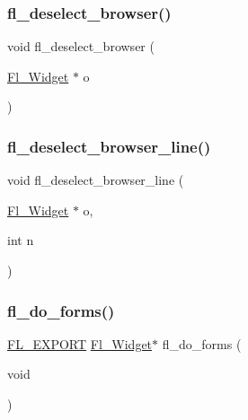 \mbox{\label{forms_8_h_a120b109edd8338165d1f036e545621f6}} 
\subsubsection{\texorpdfstring{fl\+\_\+deselect\+\_\+browser()}{fl\_deselect\_browser()}}
{\footnotesize\ttfamily void fl\+\_\+deselect\+\_\+browser (\begin{DoxyParamCaption}\item[{\hyperlink{class_fl___widget}{Fl\+\_\+\+Widget} $\ast$}]{o }\end{DoxyParamCaption})\hspace{0.3cm}{\ttfamily [inline]}}

\mbox{\label{forms_8_h_aa0e93f9fd96e44dd783f75eebfdd3c59}} 
\subsubsection{\texorpdfstring{fl\+\_\+deselect\+\_\+browser\+\_\+line()}{fl\_deselect\_browser\_line()}}
{\footnotesize\ttfamily void fl\+\_\+deselect\+\_\+browser\+\_\+line (\begin{DoxyParamCaption}\item[{\hyperlink{class_fl___widget}{Fl\+\_\+\+Widget} $\ast$}]{o,  }\item[{int}]{n }\end{DoxyParamCaption})\hspace{0.3cm}{\ttfamily [inline]}}

\mbox{\label{forms_8_h_a09ff67831ec79ddf6bfd521a79305566}} 
\subsubsection{\texorpdfstring{fl\+\_\+do\+\_\+forms()}{fl\_do\_forms()}}
{\footnotesize\ttfamily \hyperlink{_fl___export_8_h_aa9ba29a18aee9d738370a06eeb4470fc}{F\+L\+\_\+\+E\+X\+P\+O\+RT} \hyperlink{class_fl___widget}{Fl\+\_\+\+Widget}$\ast$ fl\+\_\+do\+\_\+forms (\begin{DoxyParamCaption}\item[{void}]{ }\end{DoxyParamCaption})}

